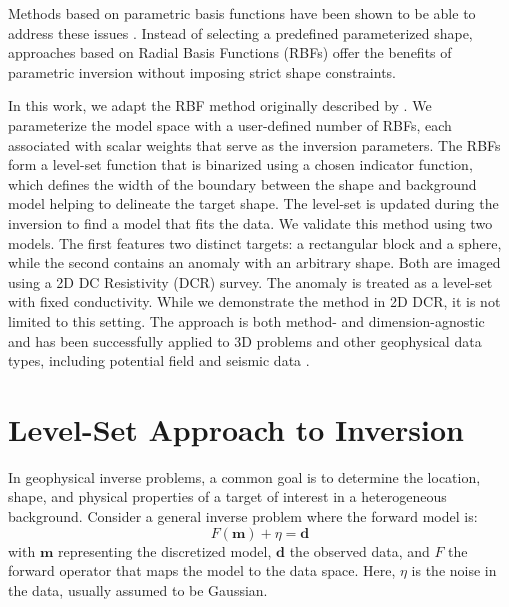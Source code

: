 \documentclass{segabs}
\begin{document}
Methods based on parametric basis functions have been shown to be able to address these issues  \citep{aghasi_parametric_2011,kadu_salt_2017, ozsar_parametric_2025}. Instead of selecting a predefined parameterized shape, approaches based on Radial Basis Functions (RBFs) offer the benefits of parametric inversion without imposing strict shape constraints. 

In this work, we adapt the RBF method originally described by \citep{aghasi_parametric_2011}. We parameterize the model space with a user-defined number of RBFs, each associated with scalar weights that serve as the inversion parameters. The RBFs form a level-set function that is binarized using a chosen indicator function, which defines the width of the boundary between the shape and background model helping to delineate the target shape. The level-set is updated during the inversion to find a model that fits the data. We validate this method using two models. The first features two distinct targets: a rectangular block and a sphere, while the second contains an anomaly with an arbitrary shape. Both are imaged using a 2D DC Resistivity (DCR) survey. The anomaly is treated as a level-set with fixed conductivity. While we demonstrate the method in 2D DCR, it is not limited to this setting. The approach is both method- and dimension-agnostic and has been successfully applied to 3D problems and other geophysical data types, including potential field and seismic data \citep{kadu_salt_2017}.  

\vspace{-0.45cm}
\section{Level-Set Approach to Inversion}
\vspace{-0.25cm}

In geophysical inverse problems, a common goal is to determine the location, shape, and physical properties of a target of interest in a heterogeneous background. Consider a general inverse problem where the forward model is: 
\begin{equation}
	F(\mathbf{m}) + \eta = \mathbf{d}
\end{equation}
with $\mathbf{m}$ representing the discretized model, $\mathbf{d}$ the observed data, and $F$ the forward operator that maps the model to the data space. Here, $\eta$ is the noise in the data, usually assumed to be Gaussian. 
\end{document}
